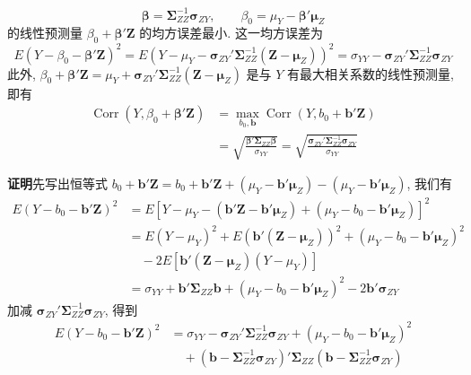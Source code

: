 \[
\boldsymbol{\beta}=\boldsymbol{\Sigma}_{ZZ}^{-1}\boldsymbol{\sigma}_{ZY},\qquad
\beta_0=\mu_Y-\boldsymbol{\beta}'\boldsymbol{\mu}_Z
\]
的线性预测量 $\beta_0+\boldsymbol{\beta}'\mathbf{Z}$ 的均方误差最小. 这一均方误差为
\[
E(Y-\beta_0-\boldsymbol{\beta}'\mathbf{Z})^2
=E\left(Y-\mu_Y-\boldsymbol{\sigma}_{ZY}'\boldsymbol{\Sigma}_{ZZ}^{-1}(\mathbf{Z}-\boldsymbol{\mu}_Z)\right)^2
=\sigma_{YY}-\boldsymbol{\sigma}_{ZY}'\boldsymbol{\Sigma}_{ZZ}^{-1}\boldsymbol{\sigma}_{ZY}
\]
此外, $\beta_0+\boldsymbol{\beta}'\mathbf{Z}=\mu_Y+\boldsymbol{\sigma}_{ZY}'\boldsymbol{\Sigma}_{ZZ}^{-1}(\mathbf{Z}-\boldsymbol{\mu}_Z)$ 是与 $Y$ 有最大相关系数的线性预测量, 即有
\[
\begin{aligned}
\operatorname{Corr}(Y,\beta_0+\boldsymbol{\beta}'\mathbf{Z})
&=\max_{b_0,\mathbf{b}}\operatorname{Corr}(Y,b_0+\mathbf{b}'\mathbf{Z})\\
&=\sqrt{\frac{\boldsymbol{\beta}'\boldsymbol{\Sigma}_{ZZ}\boldsymbol{\beta}}{\sigma_{YY}}}
=\sqrt{\frac{\boldsymbol{\sigma}_{ZY}'\boldsymbol{\Sigma}_{ZZ}^{-1}\boldsymbol{\sigma}_{ZY}}{\sigma_{YY}}}
\end{aligned}
\]

\medskip
\noindent\textbf{证明}\quad 先写出恒等式 $b_0+\mathbf{b}'\mathbf{Z}=b_0+\mathbf{b}'\mathbf{Z}+(\mu_Y-\mathbf{b}'\boldsymbol{\mu}_Z)-(\mu_Y-\mathbf{b}'\boldsymbol{\mu}_Z)$, 我们有
\[
\begin{aligned}
E(Y-b_0-\mathbf{b}'\mathbf{Z})^2
&=E\left[Y-\mu_Y-(\mathbf{b}'\mathbf{Z}-\mathbf{b}'\boldsymbol{\mu}_Z)+(\mu_Y-b_0-\mathbf{b}'\boldsymbol{\mu}_Z)\right]^2\\
&=E(Y-\mu_Y)^2+E\left(\mathbf{b}'(\mathbf{Z}-\boldsymbol{\mu}_Z)\right)^2+(\mu_Y-b_0-\mathbf{b}'\boldsymbol{\mu}_Z)^2\\
&\quad-2E\left[\mathbf{b}'(\mathbf{Z}-\boldsymbol{\mu}_Z)(Y-\mu_Y)\right]\\
&=\sigma_{YY}+\mathbf{b}'\boldsymbol{\Sigma}_{ZZ}\mathbf{b}+(\mu_Y-b_0-\mathbf{b}'\boldsymbol{\mu}_Z)^2-2\mathbf{b}'\boldsymbol{\sigma}_{ZY}
\end{aligned}
\]
加减 $\boldsymbol{\sigma}_{ZY}'\boldsymbol{\Sigma}_{ZZ}^{-1}\boldsymbol{\sigma}_{ZY}$, 得到
\[
\begin{aligned}
E(Y-b_0-\mathbf{b}'\mathbf{Z})^2
&=\sigma_{YY}-\boldsymbol{\sigma}_{ZY}'\boldsymbol{\Sigma}_{ZZ}^{-1}\boldsymbol{\sigma}_{ZY}+(\mu_Y-b_0-\mathbf{b}'\boldsymbol{\mu}_Z)^2\\
&\quad+\left(\mathbf{b}-\boldsymbol{\Sigma}_{ZZ}^{-1}\boldsymbol{\sigma}_{ZY}\right)'\boldsymbol{\Sigma}_{ZZ}\left(\mathbf{b}-\boldsymbol{\Sigma}_{ZZ}^{-1}\boldsymbol{\sigma}_{ZY}\right)
\end{aligned}
\]
